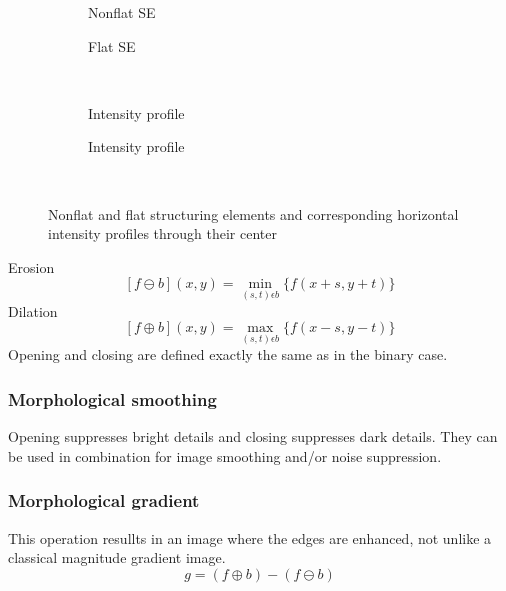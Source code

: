\begin{figure}[h!]
\centering
\begin{subfigure}[b]{0.45\textwidth}
\centering
{}
\caption{Nonflat SE}
\end{subfigure}
\begin{subfigure}[b]{0.45\textwidth}
\centering
{}
\caption{Flat SE}
\end{subfigure}\\
\begin{subfigure}[b]{0.45\textwidth}
\centering
{}
\caption{Intensity profile}
\end{subfigure}
\begin{subfigure}[b]{0.45\textwidth}
\centering
{}
\caption{Intensity profile}
\end{subfigure}\\
\caption{Nonflat and flat structuring elements and corresponding horizontal intensity profiles through their center}
\end{figure}

Erosion
\[
	[f\ominus b](x,y) = \min_{(s,t)\epsilon b} \{f(x+s,y+t)\}
\]
Dilation
\[
	[f\oplus b](x,y) = \max_{(s,t)\epsilon b} \{f(x-s,y-t)\}
\]
Opening and closing are defined exactly the same as in the binary case.
\subsubsection{Morphological smoothing}
Opening suppresses bright details and closing suppresses dark details. They can be used in combination for image smoothing and/or noise suppression.
\subsubsection{Morphological gradient}
This operation resullts in an image where the edges are enhanced, not unlike a classical magnitude gradient image.
\[
	g=(f\oplus b)-(f\ominus b)
\]
